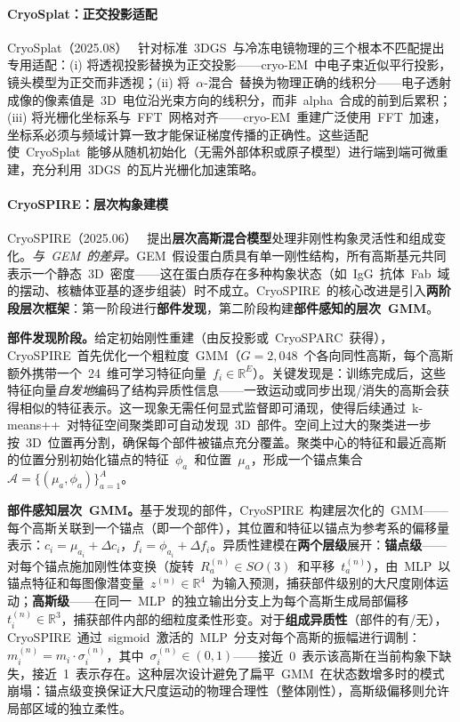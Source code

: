 \paragraph{CryoSplat：正交投影适配}

CryoSplat（2025.08）~\cite{2508_04929} 针对标准~3DGS~与冷冻电镜物理的三个根本不匹配提出专用适配：(i) 将透视投影替换为正交投影——cryo-EM~中电子束近似平行投影，镜头模型为正交而非透视；(ii) 将~$\alpha$-混合~替换为物理正确的线积分——电子透射成像的像素值是~3D~电位沿光束方向的线积分，而非~alpha~合成的前到后累积；(iii) 将光栅化坐标系与~FFT~网格对齐——cryo-EM~重建广泛使用~FFT~加速，坐标系必须与频域计算一致才能保证梯度传播的正确性。这些适配使~CryoSplat~能够从随机初始化（无需外部体积或原子模型）进行端到端可微重建，充分利用~3DGS~的瓦片光栅化加速策略。

\paragraph{CryoSPIRE：层次构象建模}

CryoSPIRE（2025.06）~\cite{2506_09063} 提出\textbf{层次高斯混合模型}处理非刚性构象灵活性和组成变化。\textit{与~GEM~的差异。}GEM~假设蛋白质具有单一刚性结构，所有高斯基元共同表示一个静态~3D~密度——这在蛋白质存在多种构象状态（如~IgG~抗体~Fab~域的摆动、核糖体亚基的逐步组装）时不成立。CryoSPIRE~的核心改进是引入\textbf{两阶段层次框架}：第一阶段进行\textbf{部件发现}，第二阶段构建\textbf{部件感知的层次~GMM}。

\textbf{部件发现阶段。}给定初始刚性重建（由反投影或~CryoSPARC~获得），CryoSPIRE~首先优化一个粗粒度~GMM（$G=2{,}048$~个各向同性高斯，每个高斯额外携带一个~24~维可学习特征向量~$f_i \in \mathbb{R}^E$）。关键发现是：训练完成后，这些特征向量\textit{自发地}编码了结构异质性信息——一致运动或同步出现/消失的高斯会获得相似的特征表示。这一现象无需任何显式监督即可涌现，使得后续通过~k-means++~对特征空间聚类即可自动发现~3D~部件。空间上过大的聚类进一步按~3D~位置再分割，确保每个部件被锚点充分覆盖。聚类中心的特征和最近高斯的位置分别初始化锚点的特征~$\phi_a$~和位置~$\mu_a$，形成一个锚点集合~$\mathcal{A} = \{(\mu_a, \phi_a)\}_{a=1}^A$。

\textbf{部件感知层次~GMM。}基于发现的部件，CryoSPIRE~构建层次化的~GMM——每个高斯关联到一个锚点（即一个部件），其位置和特征以锚点为参考系的偏移量表示：$c_i = \mu_{a_i} + \Delta c_i$，$f_i = \phi_{a_i} + \Delta f_i$。异质性建模在\textbf{两个层级}展开：\textbf{锚点级}——对每个锚点施加刚性体变换（旋转~$R_a^{(n)} \in SO(3)$~和平移~$t_a^{(n)}$），由~MLP~以锚点特征和每图像潜变量~$z^{(n)} \in \mathbb{R}^4$~为输入预测，捕获部件级别的大尺度刚体运动；\textbf{高斯级}——在同一~MLP~的独立输出分支上为每个高斯生成局部偏移~$t_i^{(n)} \in \mathbb{R}^3$，捕获部件内部的细粒度柔性形变。对于\textbf{组成异质性}（部件的有/无），CryoSPIRE~通过~sigmoid~激活的~MLP~分支对每个高斯的振幅进行调制：$m_i^{(n)} = m_i \cdot \sigma_i^{(n)}$，其中~$\sigma_i^{(n)} \in (0,1)$——接近~0~表示该高斯在当前构象下缺失，接近~1~表示存在。这种层次设计避免了扁平~GMM~在状态数增多时的模式崩塌：锚点级变换保证大尺度运动的物理合理性（整体刚性），高斯级偏移则允许局部区域的独立柔性。

